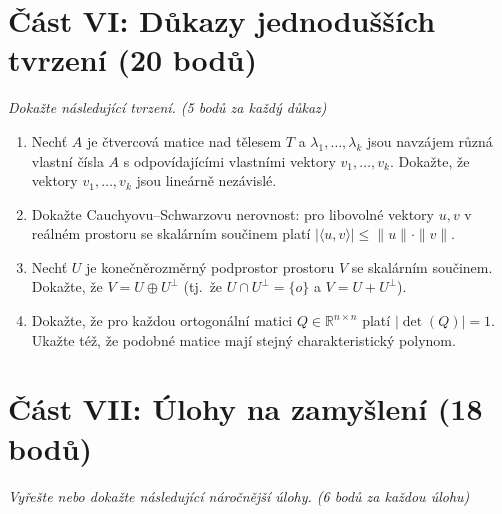 \documentclass[a4paper,11pt]{article}
\begin{document}
\vspace{0.5cm}

\section*{Část VI: Důkazy jednodušších tvrzení (20 bodů)}
\textit{Dokažte následující tvrzení. (5 bodů za každý důkaz)}

\begin{enumerate}
    \item Nechť $A$ je čtvercová matice nad tělesem $T$ a $\lambda_1, \ldots, \lambda_k$ jsou navzájem různá vlastní čísla $A$ s odpovídajícími vlastními vektory $v_1, \ldots, v_k$. Dokažte, že vektory $v_1, \ldots, v_k$ jsou lineárně nezávislé.
    
    \item Dokažte Cauchyovu--Schwarzovu nerovnost: pro libovolné vektory $u, v$ v reálném prostoru se skalárním součinem platí $|\langle u, v \rangle| \leq \|u\| \cdot \|v\|$.
    
    \item Nechť $U$ je konečněrozměrný podprostor prostoru $V$ se skalárním součinem. Dokažte, že $V = U \oplus U^\perp$ (tj.\ že $U \cap U^\perp = \{o\}$ a $V = U + U^\perp$).
    
    \item Dokažte, že pro každou ortogonální matici $Q \in \mathbb{R}^{n \times n}$ platí $|\det(Q)| = 1$. Ukažte též, že podobné matice mají stejný charakteristický polynom.
\end{enumerate}

\vspace{0.5cm}

\section*{Část VII: Úlohy na zamyšlení (18 bodů)}
\textit{Vyřešte nebo dokažte následující náročnější úlohy. (6 bodů za každou úlohu)}
\end{document}
